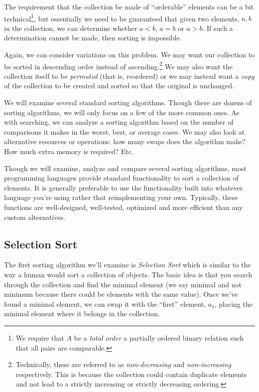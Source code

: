 The requirement that the collection be made of ``orderable'' elements can be
a bit technical\footnote{We require that $A$ be a \emph{total order} a 
partially ordered binary relation such that all pairs are comparable.}, but essentially 
we need to be guaranteed that given two elements, $a, b$ in the collection, 
we can determine whether $a < b$, $a = b$ or $a > b$.  If such a determination
cannot be made, then sorting is impossible.

Again, we can consider variations on this problem.  We may want our collection
to be sorted in descending order instead of ascending.\footnote{Technically, these are
referred to as \emph{non-decreasing} and \emph{non-increasing} respectively.  
This is because the collection could contain duplicate elements and not lead
to a strictly increasing or strictly decreasing ordering.} We may also want
the collection itself to be \emph{permuted} (that is, reordered) or we may
instead want a \emph{copy} of the collection to be created and sorted so that
the original is unchanged.

We will examine several standard sorting algorithms. Though there are dozens
of sorting algorithms, we will only focus on a few of the more common ones.  
As with 
searching, we can analyze a sorting algorithm based on the number of 
comparisons it makes in the worst, best, or average cases.  We may also look
at alternative resources or operations: how many swaps does the algorithm make?
How much extra memory is required?  Etc.

Though we will examine, analyze and compare several sorting algorithms, most
programming languages provide standard functionality to sort a collection of
elements.  It is generally preferable to use the functionality built into 
whatever language you're using rather that reimplementing your own.  Typically, 
these functions are well-designed, well-tested, optimized and more efficient
than any custom alternatives.

\subsection{Selection Sort}

The first sorting algorithm we'll examine is \emph{Selection Sort} which is
similar to the way a human would sort a collection of objects.  The basic idea
is that you search through the collection and find the minimal element 
(we say minimal and not minimum because there could be elements with the
same value).  Once we've found a minimal element, we can swap it with the
``first'' element, $a_1$, placing the minimal element where it belongs in
the collection.  

